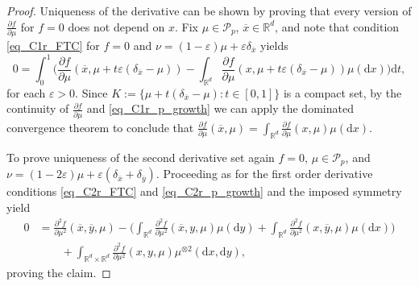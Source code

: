 \documentclass{article}
\theoremstyle{definition}
\numberwithin{equation}{section}
\numberwithin{theorem}{section}
\newcommand{\R}{\mathbb{R}}
\newcommand{\dx}{\mathrm{d}x}
\newcommand{\dy}{\mathrm{d}y}
\newcommand{\dt}{\mathrm{d}t}
\newcommand{\e}{\varepsilon}
\newcommand{\Pcal}{{\mathcal P}}
\begin{document}
\begin{appendix}
\begin{proof}
	
	
	Uniqueness of the derivative can be shown by proving that every version of $\frac{\partial f}{\partial\mu}$ for $f=0$ does not depend on $x$. 
   Fix $\mu\in \Pcal_p$, $\overline x \in \R^d$, and note that condition \eqref{eq_C1r_FTC} for $f=0$ and  $\nu=(1-\e)\mu+\e\delta_{\overline x}$ yields 
$$
0 = \int_0^1 \bigg(\frac{\partial f}{\partial\mu}(\overline x,\mu+t\e(\delta_{\overline x}-\mu))-\int_{\R^d} \frac{\partial f}{\partial\mu}(x,\mu+t\e(\delta_{\overline x}-\mu))\mu(\dx)\bigg)\dt,
$$
  for each $\e>0$. Since $K:=\{\mu+t(\delta_{\overline x}-\mu)\colon t\in [0,1]\}$ is a compact set, by the continuity of $\frac{\partial f}{\partial\mu}$ and \eqref{eq_C1r_p_growth} we can apply the dominated convergence theorem to conclude that $\frac{\partial f}{\partial\mu}(\overline x,\mu)=\int_{\R^d} \frac{\partial f}{\partial\mu}(x,\mu)\mu(\dx)$. 
 

To prove uniqueness of the second derivative  set again $f=0$, $\mu\in \Pcal_p$, and $\nu=(1-2\e)\mu+\e(\delta_{\overline x}+\delta_{\overline y})$.
Proceeding as for the first order derivative  conditions \eqref{eq_C2r_FTC} and  \eqref{eq_C2r_p_growth} and the imposed symmetry yield
$$
\begin{aligned}
0&= \frac{\partial^2 f}{\partial\mu^2}(\overline x,\overline y,\mu)
-\Big(\int_{\R^d}\frac{\partial^2 f}{\partial\mu^2}(\overline x,y,\mu) \mu(\dy)
+\int_{\R^d}\frac{\partial^2 f}{\partial\mu^2}(x,\overline y,\mu) \mu(\dx)\Big)\\
&\qquad+\int_{{\R^d}\times {\R^d}} \frac{\partial^2 f}{\partial\mu^2}(x,y,\mu)\mu^{\otimes 2}(\dx,\dy),
\end{aligned}
$$
  proving the claim.
\end{proof}
\end{appendix}





\end{document}
